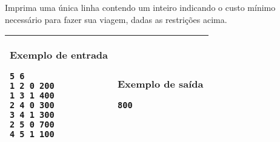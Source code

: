Imprima uma única linha contendo um inteiro indicando o custo mínimo necessário
para fazer sua viagem, dadas as restrições acima.

\begin{table}[!h]
\centering
\begin{tabular}{|l|l|}
\hline
\begin{minipage}[t]{3in}
\textbf{Exemplo de entrada}
\begin{verbatim}
5 6
1 2 0 200
1 3 1 400
2 4 0 300
3 4 1 300
2 5 0 700
4 5 1 100
\end{verbatim}
\vspace{1mm}
\end{minipage}
&

\begin{minipage}[t]{3in}
\textbf{Exemplo de saída}
\begin{verbatim}
800
\end{verbatim}
\vspace{1mm}
\end{minipage} \\
\hline
\end{tabular}
\end{table}
